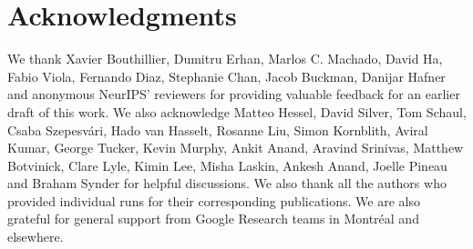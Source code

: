 \vspace{-0.1cm}
\section*{Acknowledgments} 
\vspace{-0.1cm}
We thank Xavier Bouthillier, Dumitru Erhan, Marlos C. Machado, David Ha, Fabio Viola, Fernando Diaz,  Stephanie Chan, Jacob Buckman, Danijar Hafner and anonymous NeurIPS' reviewers for providing valuable feedback for an earlier draft of this work. We also acknowledge  Matteo Hessel, David Silver, Tom Schaul, Csaba Szepesvári, Hado van Hasselt, Rosanne Liu, Simon Kornblith, Aviral Kumar, George Tucker, Kevin Murphy, Ankit Anand, Aravind Srinivas, Matthew Botvinick, Clare Lyle, Kimin Lee, Misha Laskin, Ankesh Anand, Joelle Pineau and Braham Synder for helpful discussions. We also thank all the authors who provided individual runs for their corresponding publications. We are also grateful for general support from Google Research teams in Montréal and elsewhere.